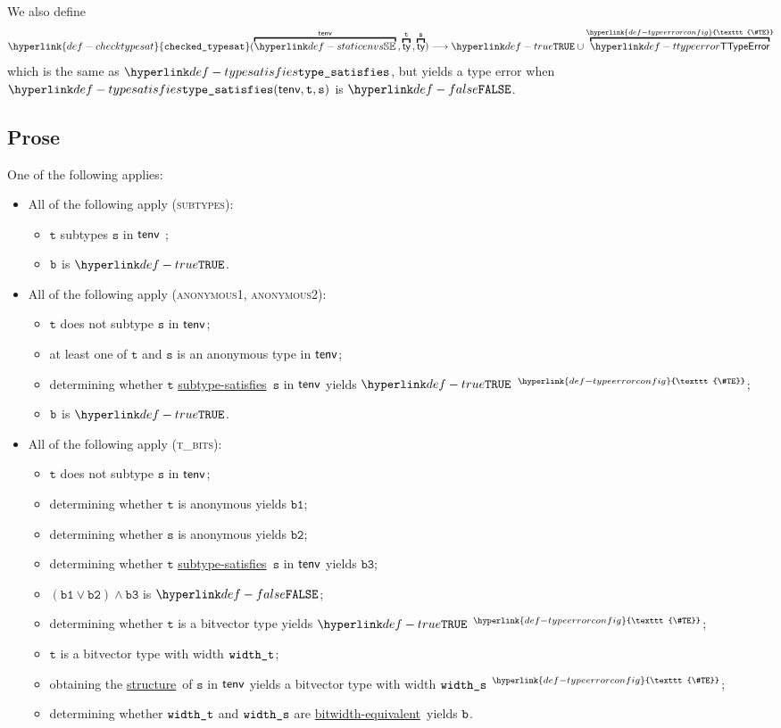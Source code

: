 \documentclass{book}
\newcommand\TypeErrorConfig[0]{\hyperlink{def-typeerrorconfig}{\texttt{\#TE}}}
\newcommand\ProseOrTypeError[0]{\hyperlink{def-proseortypeerror}{$^{\TypeErrorConfig}$}}
\newcommand\checktypesat[0]{\hyperlink{def-checktypesat}{\texttt{checked\_typesat}}}
\newcommand\structure[0]{\hyperlink{def-structure}{structure}}
\newcommand\subtypesatisfies[0]{\hyperlink{def-subtypesatisfies}{subtype-satisfies}}
\newcommand\bitwidthequivalent[0]{\hyperlink{def-bitwidthequal}{bitwidth-equivalent}}
\newcommand\vt[0]{\texttt{t}}
\newcommand\vs[0]{\texttt{s}}
\newcommand\vbone[0]{\texttt{b1}}
\newcommand\vbtwo[0]{\texttt{b2}}
\newcommand\vbthree[0]{\texttt{b3}}
\begin{document}
\hypertarget{def-checktypesat}{}
We also define
\[
  \checktypesat(\overname{\staticenvs}{\tenv} \aslsep \overname{\ty}{\vt} \aslsep \overname{\ty}{\vs})
  \aslto \True \cup \overname{\TTypeError}{\TypeErrorConfig}
\]
which is the same as $\typesat$, but yields a type error when \\ $\typesat(\tenv, \vt, \vs)$ is $\False$.

\subsection{Prose}
One of the following applies:
 \begin{itemize}
  \item All of the following apply (\textsc{subtypes}):
    \begin{itemize}
    \item $\vt$ subtypes $\vs$ in $\textsf{tenv}$ ;
    \item $\texttt{b}$ is $\True$.
  \end{itemize}

  \item All of the following apply (\textsc{anonymous1}, \textsc{anonymous2}):
  \begin{itemize}
    \item $\vt$ does not subtype $\vs$ in $\textsf{tenv}$;
    \item at least one of $\vt$ and $\vs$ is an anonymous type in $\textsf{tenv}$;
    \item determining whether $\vt$ \subtypesatisfies\ $\vs$ in $\textsf{tenv}$ yields $\True$ \ProseOrTypeError;
    \item $\texttt{b}$ is $\True$.
  \end{itemize}

  \item All of the following apply (\textsc{t\_bits}):
  \begin{itemize}
    \item $\vt$ does not subtype $\vs$ in $\textsf{tenv}$;
    \item determining whether $\vt$ is anonymous yields $\vbone$;
    \item determining whether $\vs$ is anonymous yields $\vbtwo$;
    \item determining whether $\vt$ \subtypesatisfies\ $\vs$ in $\textsf{tenv}$ yields $\vbthree$;
    \item $(\vbone \lor \vbtwo) \land \vbthree$ is $\False$;
    \item determining whether $\vt$ is a bitvector type yields $\True$ \ProseOrTypeError;
    \item $\vt$ is a bitvector type with width $\texttt{width\_t}$;
    \item obtaining the \structure\ of $\vs$ in $\textsf{tenv}$ yields a bitvector type with width $\texttt{width\_s}$ \ProseOrTypeError;
    \item determining whether $\texttt{width\_t}$ and $\texttt{width\_s}$ are \bitwidthequivalent\ yields $\texttt{b}$.
  \end{itemize}


\end{itemize}
\end{document}
